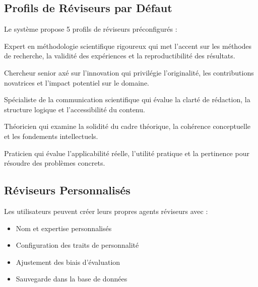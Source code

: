 \documentclass[12pt,a4paper]{article}
\begin{document}
\subsection{Profils de Réviseurs par Défaut}

Le système propose 5 profils de réviseurs préconfigurés :

\begin{tcolorbox}[colback=accentgold!5,colframe=accentgold,title=Dr. Methodology]
Expert en méthodologie scientifique rigoureux qui met l'accent sur les méthodes de recherche, la validité des expériences et la reproductibilité des résultats.
\end{tcolorbox}

\begin{tcolorbox}[colback=accentgold!5,colframe=accentgold,title=Prof. Novelty]
Chercheur senior axé sur l'innovation qui privilégie l'originalité, les contributions novatrices et l'impact potentiel sur le domaine.
\end{tcolorbox}

\begin{tcolorbox}[colback=accentgold!5,colframe=accentgold,title=Dr. Clarity]
Spécialiste de la communication scientifique qui évalue la clarté de rédaction, la structure logique et l'accessibilité du contenu.
\end{tcolorbox}

\begin{tcolorbox}[colback=accentgold!5,colframe=accentgold,title=Prof. Theory]
Théoricien qui examine la solidité du cadre théorique, la cohérence conceptuelle et les fondements intellectuels.
\end{tcolorbox}

\begin{tcolorbox}[colback=accentgold!5,colframe=accentgold,title=Dr. Practical]
Praticien qui évalue l'applicabilité réelle, l'utilité pratique et la pertinence pour résoudre des problèmes concrets.
\end{tcolorbox}

\subsection{Réviseurs Personnalisés}

Les utilisateurs peuvent créer leurs propres agents réviseurs avec :
\begin{itemize}
    \item Nom et expertise personnalisés
    \item Configuration des traits de personnalité
    \item Ajustement des biais d'évaluation
    \item Sauvegarde dans la base de données
\end{itemize}
\end{document}
